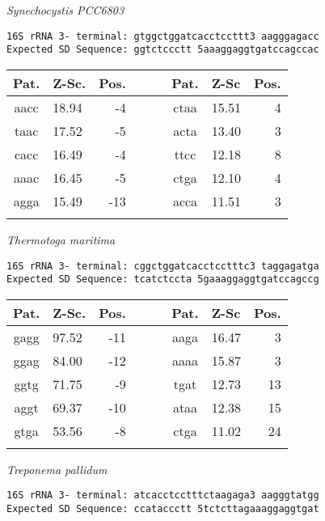 \vspace{1em}
\noindent
{\it Synechocystis PCC6803    }
\begin{verbatim}
16S rRNA 3- terminal: gtggctggatcacctccttt3 aagggagacc
Expected SD Sequence: ggtctccctt 5aaaggaggtgatccagccac
\end{verbatim}

\noindent
\begin{center}
\begin{tabular}{clrcclr}
Pat. & Z-Sc. & Pos. & \verb+   + & Pat. & Z-Sc & Pos. \\
\hline
aacc & 18.94 & -4 &  & ctaa & 15.51 & 4 \\
taac & 17.52 & -5 &  & acta & 13.40 & 3 \\
cacc & 16.49 & -4 &  & ttcc & 12.18 & 8 \\
aaac & 16.45 & -5 &  & ctga & 12.10 & 4 \\
agga & 15.49 & -13 &  & acca & 11.51 & 3 \\
    &     \\
\end{tabular}
\end{center}

\vspace{1em}
\noindent
{\it Thermotoga maritima    }
\begin{verbatim}
16S rRNA 3- terminal: cggctggatcacctcctttc3 taggagatga
Expected SD Sequence: tcatctccta 5gaaaggaggtgatccagccg
\end{verbatim}

\noindent
\begin{center}
\begin{tabular}{clrcclr}
Pat. & Z-Sc. & Pos. & \verb+   + & Pat. & Z-Sc & Pos. \\
\hline
gagg & 97.52 & -11 &  & aaga & 16.47 & 3 \\
ggag & 84.00 & -12 &  & aaaa & 15.87 & 3 \\
ggtg & 71.75 & -9 &  & tgat & 12.73 & 13 \\
aggt & 69.37 & -10 &  & ataa & 12.38 & 15 \\
gtga & 53.56 & -8 &  & ctga & 11.02 & 24 \\
    &     \\
\end{tabular}
\end{center}

\vspace{1em}
\noindent
{\it Treponema pallidum    }
\begin{verbatim}
16S rRNA 3- terminal: atcacctcctttctaagaga3 aagggtatgg
Expected SD Sequence: ccataccctt 5tctcttagaaaggaggtgat
\end{verbatim}

